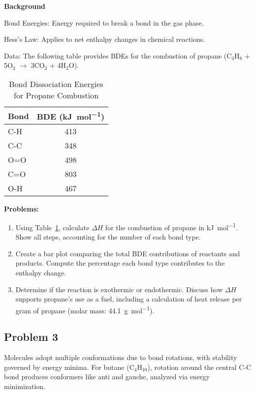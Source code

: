 \documentclass[12pt]{article}
\begin{document}
\textbf{Background}

Bond Energies: Energy required to break a bond in the gas phase.

Hess’s Law: Applies to net enthalpy changes in chemical reactions.

Data: The following table provides BDEs for the combustion of propane (C$_3$H$_8$ + 5O$_2$ $\to$ 3CO$_2$ + 4H$_2$O).

\begin{table}[h]
\centering
\caption{Bond Dissociation Energies for Propane Combustion}
\label{tab:q2_data}
\begin{tabular}{lc}
\toprule
Bond & BDE (\si{\kilo\joule\per\mole}) \\
\midrule
C-H  & 413 \\
C-C  & 348 \\
O=O  & 498 \\
C=O  & 803 \\
O-H  & 467 \\
\bottomrule
\end{tabular}
\end{table}

\textbf{Problems:}

\begin{enumerate}
\item Using Table~\ref{tab:q2_data}, calculate $\Delta H$ for the combustion of propane in \si{\kilo\joule\per\mole}. Show all steps, accounting for the number of each bond type.

\item Create a bar plot comparing the total BDE contributions of reactants and products. Compute the percentage each bond type contributes to the enthalpy change.

\item Determine if the reaction is exothermic or endothermic. Discuss how $\Delta H$ supports propane’s use as a fuel, including a calculation of heat release per gram of propane (molar mass: \SI{44.1}{\gram\per\mole}).
\end{enumerate}

\newpage
\subsection{Problem 3}
Molecules adopt multiple conformations due to bond rotations, with stability governed by energy minima. For butane (C$_4$H$_{10}$), rotation around the central C-C bond produces conformers like anti and gauche, analyzed via energy minimization.
\end{document}
